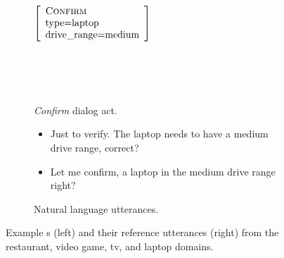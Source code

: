 \begin{figure}[p]
\begin{subfigure}{.35\textwidth}
~\\~\\

$\left[\begin{array}{l} 
    \textsc{Confirm} \\ 
    \textrm{type=laptop} \\
    \textrm{drive\_range=medium} \\
\end{array}\right]$ 

~\\~\\~\\

\caption{\emph{Confirm} dialog act.}\label{fig:confirmexample}
\end{subfigure}\hfill \begin{subfigure}{.58\textwidth}
\begin{itemize}
   \item Just to verify. The laptop needs to have a medium drive range, correct?
   \item Let me confirm, a laptop in the medium drive range right?
\end{itemize}
\caption{Natural language utterances.}
\label{fig:mr1utt}
\end{subfigure}



\caption{Example \meaningrepresentation s (left) and their reference utterances (right)
from the restaurant, video game, tv, and laptop domains.}
\label{fig:nlgexamples}
\end{figure}

